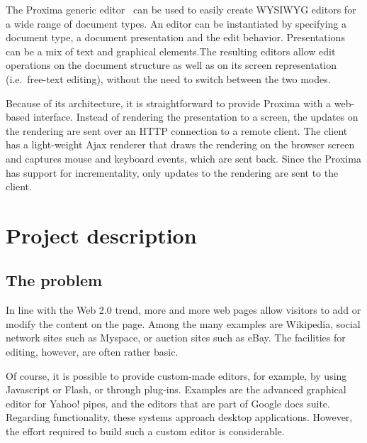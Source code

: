 \documentclass[10pt]{article}
\begin{document}
The Proxima generic editor~\cite{schrage08proximaHome, schrage04proxima} can be used to easily create WYSIWYG editors for a wide range of document types. An editor can be instantiated by specifying a document type, a document presentation and the edit behavior. Presentations can be a mix of text and graphical elements.The resulting editors allow edit operations on the document structure as well as on its screen representation (i.e.\ free-text editing), without the need to switch between the two modes.

Because of its architecture, it is straightforward to provide Proxima with a web-based interface. Instead of rendering the presentation to a screen, the updates on the rendering are sent over an HTTP connection to a remote client. The client has a light-weight Ajax renderer that draws the rendering on the browser screen and captures mouse and keyboard events, which are sent back. Since the Proxima has support for incrementality, only updates to the rendering are sent to the client.

\ec



\bc
\section{Project description}

\subsection{The problem} 

In line with the Web 2.0 trend, more and more web pages allow visitors to add or modify the content on the page. Among the many examples are Wikipedia, social network sites such as Myspace, or auction sites such as eBay. The facilities for editing, however, are often rather basic. 

Of course, it is possible to provide custom-made editors, for example, by using Javascript or Flash, or through plug-ins. Examples are the advanced graphical editor for Yahoo! pipes, and the editors that are part of Google docs suite. Regarding functionality, these systems approach desktop applications. However, the effort required to build such a custom editor is considerable.
\end{document}
